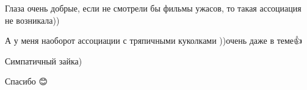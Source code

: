 \begin{itemize} %

Глаза очень добрые, если не смотрели бы фильмы ужасов, то такая ассоциация не
возникала))

\end{itemize} %


А у меня наоборот ассоциации с тряпичными куколками ))очень даже в теме👍🌸


Симпатичный зайка)

\begin{itemize} %
Спасибо 😊
\end{itemize} %
